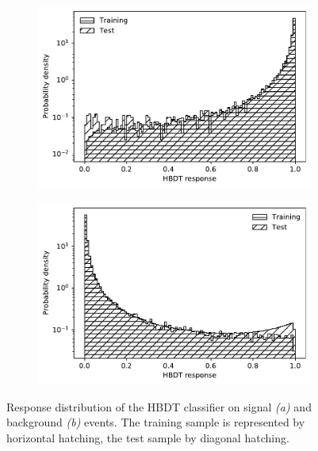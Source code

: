 \begin{figure}[t]
	\centering
	\begin{subfigure}{.45\textwidth}
		\includegraphics[width=\textwidth]{graphics/04-event_selection/sig_train_vs_test.pdf}
		\caption{}
	\end{subfigure}
	\begin{subfigure}{.45\textwidth}
		\includegraphics[width=\textwidth]{graphics/04-event_selection/bkg_train_vs_test.pdf}
		\caption{}
	\end{subfigure}
	\caption{Response distribution of the HBDT classifier on signal \textit{(a)} and background \textit{(b)} events. The training sample is represented by horizontal hatching, the test sample by diagonal hatching.}
\end{figure}

